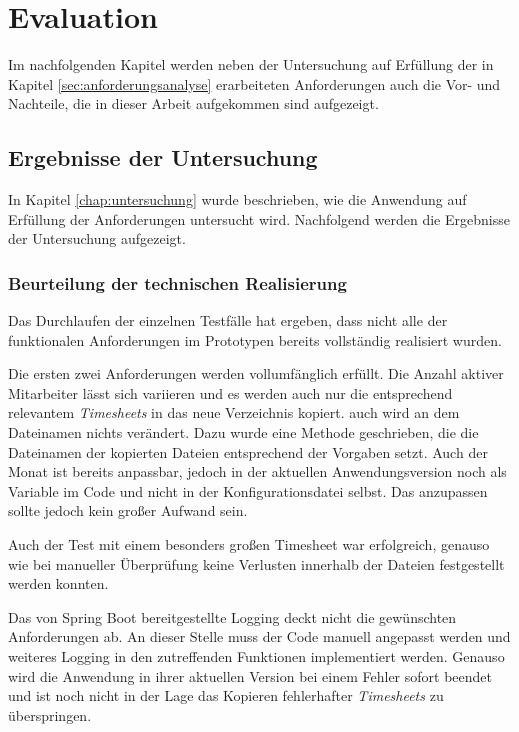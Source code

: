\chapter{Evaluation}
Im nachfolgenden Kapitel werden neben der Untersuchung auf Erfüllung der in Kapitel \ref{sec:anforderungsanalyse} erarbeiteten Anforderungen auch die Vor- und Nachteile, die in dieser Arbeit aufgekommen sind aufgezeigt.

\section{Ergebnisse der Untersuchung}
In Kapitel \ref{chap:untersuchung} wurde beschrieben, wie die Anwendung auf Erfüllung der Anforderungen untersucht wird. Nachfolgend werden die Ergebnisse der Untersuchung aufgezeigt.

\subsection{Beurteilung der technischen Realisierung}
Das Durchlaufen der einzelnen Testfälle hat ergeben, dass nicht alle der funktionalen Anforderungen im Prototypen bereits vollständig realisiert wurden.

Die ersten zwei Anforderungen werden vollumfänglich erfüllt. Die Anzahl aktiver Mitarbeiter lässt sich variieren und es werden auch nur die entsprechend relevantem \textit{\glspl{Timesheet}} in das neue Verzeichnis kopiert. auch wird an dem Dateinamen nichts verändert. Dazu wurde eine Methode geschrieben, die die Dateinamen der kopierten Dateien entsprechend der Vorgaben setzt. Auch der Monat ist bereits anpassbar, jedoch in der aktuellen Anwendungsversion noch als Variable im Code und nicht in der Konfigurationsdatei selbst. Das anzupassen sollte jedoch kein großer Aufwand sein.

Auch der Test mit einem besonders großen \gls{Timesheet} war erfolgreich, genauso wie bei manueller Überprüfung keine Verlusten innerhalb der Dateien festgestellt werden konnten.

Das von \gls{Spring Boot} bereitgestellte Logging deckt nicht die gewünschten Anforderungen ab. An dieser Stelle muss der Code manuell angepasst werden und weiteres Logging in den zutreffenden Funktionen implementiert werden. Genauso wird die Anwendung in ihrer aktuellen Version bei einem Fehler sofort beendet und ist noch nicht in der Lage das Kopieren fehlerhafter \textit{\glspl{Timesheet}} zu überspringen. \pagebreak

